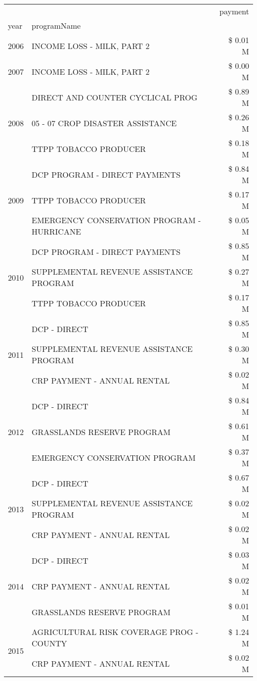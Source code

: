 \begin{tabular}{llr}
\toprule
 &  & payment \\
year & programName &  \\
\midrule
2006 & INCOME LOSS - MILK, PART 2 & \$ 0.01 M \\
\cline{1-3}
2007 & INCOME LOSS - MILK, PART 2 & \$ 0.00 M \\
\cline{1-3}
\multirow[t]{3}{*}{2008} & DIRECT AND COUNTER CYCLICAL PROG & \$ 0.89 M \\
 & 05 - 07 CROP DISASTER ASSISTANCE & \$ 0.26 M \\
 & TTPP TOBACCO PRODUCER & \$ 0.18 M \\
\cline{1-3}
\multirow[t]{3}{*}{2009} & DCP PROGRAM - DIRECT PAYMENTS & \$ 0.84 M \\
 & TTPP TOBACCO PRODUCER & \$ 0.17 M \\
 & EMERGENCY CONSERVATION PROGRAM - HURRICANE & \$ 0.05 M \\
\cline{1-3}
\multirow[t]{3}{*}{2010} & DCP PROGRAM - DIRECT PAYMENTS & \$ 0.85 M \\
 & SUPPLEMENTAL REVENUE ASSISTANCE PROGRAM & \$ 0.27 M \\
 & TTPP TOBACCO PRODUCER & \$ 0.17 M \\
\cline{1-3}
\multirow[t]{3}{*}{2011} & DCP - DIRECT & \$ 0.85 M \\
 & SUPPLEMENTAL REVENUE ASSISTANCE PROGRAM & \$ 0.30 M \\
 & CRP PAYMENT - ANNUAL RENTAL & \$ 0.02 M \\
\cline{1-3}
\multirow[t]{3}{*}{2012} & DCP - DIRECT & \$ 0.84 M \\
 & GRASSLANDS RESERVE PROGRAM & \$ 0.61 M \\
 & EMERGENCY CONSERVATION PROGRAM & \$ 0.37 M \\
\cline{1-3}
\multirow[t]{3}{*}{2013} & DCP - DIRECT & \$ 0.67 M \\
 & SUPPLEMENTAL REVENUE ASSISTANCE PROGRAM & \$ 0.02 M \\
 & CRP PAYMENT - ANNUAL RENTAL & \$ 0.02 M \\
\cline{1-3}
\multirow[t]{3}{*}{2014} & DCP - DIRECT & \$ 0.03 M \\
 & CRP PAYMENT - ANNUAL RENTAL & \$ 0.02 M \\
 & GRASSLANDS RESERVE PROGRAM & \$ 0.01 M \\
\cline{1-3}
\multirow[t]{3}{*}{2015} & AGRICULTURAL RISK COVERAGE PROG - COUNTY & \$ 1.24 M \\
 & CRP PAYMENT - ANNUAL RENTAL & \$ 0.02 M \\

\end{tabular}
